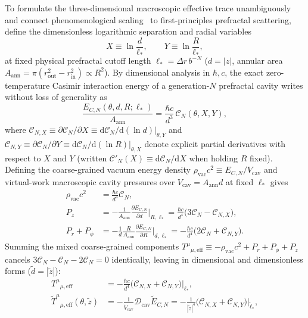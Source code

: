 \documentclass[aps,prd,twocolumn,10pt,showkeys,nofootinbib,floatfix,longbibliography]{revtex4-2}
\newcommand{\dd}{\mathrm{d}}
\begin{document}
To formulate the three-dimensional macroscopic effective trace unambiguously and connect phenomenological scaling~\cite{gordon2026prd} to first-principles prefractal scattering, define the dimensionless logarithmic separation and radial variables
\begin{equation}
X \equiv \ln\frac{d}{\ell_*}, \qquad Y \equiv \ln\frac{R}{\ell_*},
\label{eq:log_scale_vars}
\end{equation}
at fixed physical prefractal cutoff length $\ell_* = \Delta r\,b^{-N}$ ($d = |z|$, annular area $A_{\mathrm{ann}} = \pi(r_{\mathrm{out}}^2 - r_{\mathrm{in}}^2) \propto R^2$). By dimensional analysis in $\hbar, c$, the exact zero-temperature Casimir interaction energy of a generation-$N$ prefractal cavity writes without loss of generality as
\begin{equation}
\frac{E_{C,N}(\theta, d, R; \ell_*)}{A_{\mathrm{ann}}} = \frac{\hbar c}{d^3}\,\mathcal{C}_N(\theta, X, Y),
\label{eq:dimensional_casimir_scaling}
\end{equation}
where $\mathcal{C}_{N,X} \equiv \partial\mathcal{C}_N/\partial X \equiv \dd\mathcal{C}_N/\dd(\ln d)|_{\theta,Y}$ and $\mathcal{C}_{N,Y} \equiv \partial\mathcal{C}_N/\partial Y \equiv \dd\mathcal{C}_N/\dd(\ln R)|_{\theta,X}$ denote explicit partial derivatives with respect to $X$ and $Y$ (written $\mathcal{C}'_N(X) \equiv \dd\mathcal{C}_N/\dd X$ when holding $R$ fixed). Defining the coarse-grained vacuum energy density $\rho_{\mathrm{vac}}c^2 \equiv E_{C,N} / V_{\mathrm{cav}}$ and virtual-work macroscopic cavity pressures over $V_{\mathrm{cav}} = A_{\mathrm{ann}} d$ at fixed $\ell_*$ gives
\begin{align}
\rho_{\mathrm{vac}}c^2 &= \frac{\hbar c}{d^4}\mathcal{C}_N, \nonumber\\
P_z &= -\frac{1}{A_{\mathrm{ann}}}\frac{\partial E_{C,N}}{\partial d}\Bigg|_{R,\ell_*} = \frac{\hbar c}{d^4}\bigl(3\mathcal{C}_N - \mathcal{C}_{N,X}\bigr), \nonumber\\
P_r + P_\phi &= -\frac{1}{d}\frac{R}{A_{\mathrm{ann}}}\frac{\partial E_{C,N}}{\partial R}\Bigg|_{d,\ell_*} = -\frac{\hbar c}{d^4}\bigl(2\mathcal{C}_N + \mathcal{C}_{N,Y}\bigr).
\label{eq:macroscopic_pressures_si}
\end{align}
Summing the mixed coarse-grained components $T^\mu{}_{\mu,\mathrm{eff}} \equiv -\rho_{\mathrm{vac}}c^2 + P_r + P_\phi + P_z$ cancels $3\mathcal{C}_N - \mathcal{C}_N - 2\mathcal{C}_N = 0$ identically, leaving in dimensional and dimensionless forms ($\tilde{d} = |\tilde{z}|$):
\begin{align}
T^\mu{}_{\mu,\mathrm{eff}} &= -\frac{\hbar c}{d^4}\bigl(\mathcal{C}_{N,X} + \mathcal{C}_{N,Y}\bigr)\Big|_{\ell_*}, \nonumber\\
\tilde{T}^\mu{}_{\mu,\mathrm{eff}}(\theta, \tilde{z}) &= -\frac{1}{\tilde{V}_{\mathrm{cav}}}\mathcal{D}_{\mathrm{cav}}\tilde{E}_{C,N} = -\frac{1}{|\tilde{z}|^4}\bigl(\mathcal{C}_{N,X} + \mathcal{C}_{N,Y}\bigr)\Big|_{\tilde{\ell}_*},
\label{eq:effective_trace_3d}
\end{align}
\end{document}
